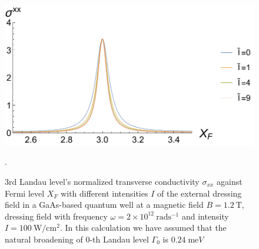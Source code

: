 \begin{figure}[t]
\includegraphics[scale=0.55]{figures/fig_6}
\caption{\label{fig_5} $3$rd Landau level’s normalized transverse conductivity $\sigma_{xx}$ against Fermi level $X_F$ with different intensities $I$ of the external dressing field in a GaAs-based quantum well at a magnetic field $B = 1.2~\text{T}$, dressing field with frequency $\omega =2\times10^{12}~\text{rad}\text{s}^{-1}$ and intensity $I =100~\text{W}/\text{cm}^{2}$. In this calculation we have assumed that the natural  broadening of $0$-th Landau level $\Gamma_0$ is $0.24\;\text{me}V$}.
\end{figure}
